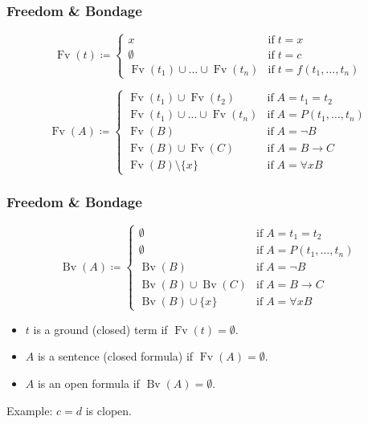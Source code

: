 \documentclass[UTF8,11pt,colorlinks,compress,openany]{beamer}%
\begin{document}
\begin{frame}\frametitle{Freedom \& Bondage}
	\begin{definition}
		\[
		\operatorname{Fv}(t)\coloneqq 
		\begin{cases}
		x &\text{if}\;t=x\\
		\emptyset &\text{if}\;t=c\\
		\operatorname{Fv}(t_1)\cup\dots\cup \operatorname{Fv}(t_n) &\text{if}\;t=f(t_1,\dots,t_n)
		\end{cases}
		\]
	\end{definition}
	\begin{definition}
		\[
		\operatorname{Fv}(A)\coloneqq 
		\begin{cases}
		\operatorname{Fv}(t_1)\cup \operatorname{Fv}(t_2) &\text{if}\; A=t_1=t_2\\
		\operatorname{Fv}(t_1)\cup\dots\cup \operatorname{Fv}(t_n) &\text{if}\; A=P(t_1,\dots,t_n)\\
		\operatorname{Fv}(B) &\text{if}\; A=\neg B\\
		\operatorname{Fv}(B)\cup \operatorname{Fv}(C) &\text{if}\; A=B\to C\\
		\operatorname{Fv}(B)\setminus\{x\} &\text{if}\; A=\forall x B
		\end{cases}
		\]
	\end{definition}
\end{frame}

\begin{frame}\frametitle{Freedom \& Bondage}
	\begin{definition}
		\[\operatorname{Bv}(A)\coloneqq 
		\begin{cases}
		\emptyset &\text{if}\; A=t_1=t_2\\
		\emptyset &\text{if}\; A=P(t_1,\dots,t_n)\\
		\operatorname{Bv}(B) &\text{if}\; A=\neg B\\
		\operatorname{Bv}(B)\cup \operatorname{Bv}(C) &\text{if}\; A=B\to C\\
		\operatorname{Bv}(B)\cup\{x\} &\text{if}\; A=\forall x B
		\end{cases}\]
	\end{definition}
\begin{itemize}
	\item $t$ is a ground (closed) term if $\operatorname{Fv}(t)=\emptyset$.
	\item $A$ is a sentence (closed formula) if $\operatorname{Fv}(A)=\emptyset$.
	\item $A$ is an open formula if $\operatorname{Bv}(A)=\emptyset$.
\end{itemize}
	Example: $c=d$ is clopen.
\end{frame}
\end{document}
